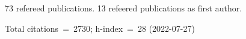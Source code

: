 73 refereed publications. 13 refeered publications as first author.

Total citations~=~2730; h-index~=~28 (2022-07-27)